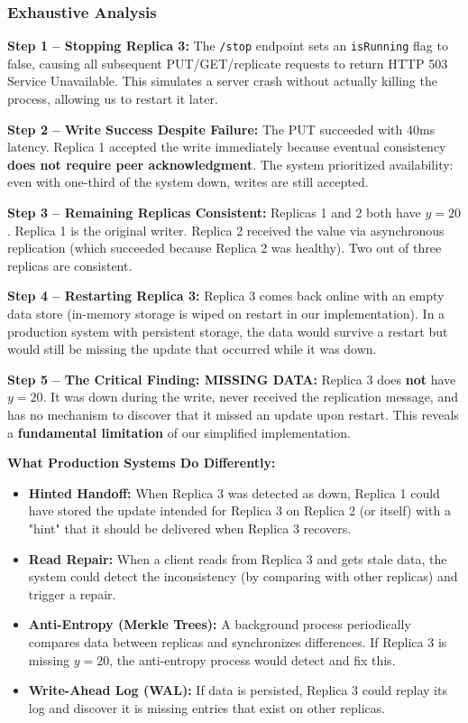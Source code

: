 \documentclass[10pt,a4paper]{article}
\begin{document}
\subsubsection{Exhaustive Analysis}

\textbf{Step 1 -- Stopping Replica 3:} The \texttt{/stop} endpoint sets an \texttt{isRunning} flag to false, causing all subsequent PUT/GET/replicate requests to return HTTP 503 Service Unavailable. This simulates a server crash without actually killing the process, allowing us to restart it later.

\textbf{Step 2 -- Write Success Despite Failure:} The PUT succeeded with 40ms latency. Replica 1 accepted the write immediately because eventual consistency \textbf{does not require peer acknowledgment}. The system prioritized availability: even with one-third of the system down, writes are still accepted.

\textbf{Step 3 -- Remaining Replicas Consistent:} Replicas 1 and 2 both have $y=20$. Replica 1 is the original writer. Replica 2 received the value via asynchronous replication (which succeeded because Replica 2 was healthy). Two out of three replicas are consistent.

\textbf{Step 4 -- Restarting Replica 3:} Replica 3 comes back online with an empty data store (in-memory storage is wiped on restart in our implementation). In a production system with persistent storage, the data would survive a restart but would still be missing the update that occurred while it was down.

\textbf{Step 5 -- The Critical Finding: MISSING DATA:} Replica 3 does \textbf{not} have $y=20$. It was down during the write, never received the replication message, and has no mechanism to discover that it missed an update upon restart. This reveals a \textbf{fundamental limitation} of our simplified implementation.

\textbf{What Production Systems Do Differently:}
\begin{itemize}
    \item \textbf{Hinted Handoff:} When Replica 3 was detected as down, Replica 1 could have stored the update intended for Replica 3 on Replica 2 (or itself) with a "hint" that it should be delivered when Replica 3 recovers.
    \item \textbf{Read Repair:} When a client reads from Replica 3 and gets stale data, the system could detect the inconsistency (by comparing with other replicas) and trigger a repair.
    \item \textbf{Anti-Entropy (Merkle Trees):} A background process periodically compares data between replicas and synchronizes differences. If Replica 3 is missing $y=20$, the anti-entropy process would detect and fix this.
    \item \textbf{Write-Ahead Log (WAL):} If data is persisted, Replica 3 could replay its log and discover it is missing entries that exist on other replicas.
\end{itemize}
\end{document}
